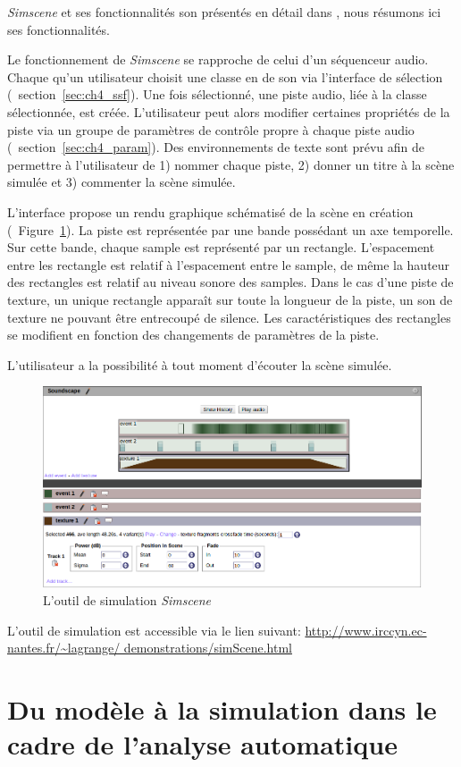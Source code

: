 \emph{Simscene} et ses fonctionnalités son présentés en détail dans \citep{rossignol2015simscene}, nous résumons ici ses fonctionnalités. 

Le fonctionnement de \emph{Simscene} se rapproche de celui d'un séquenceur audio. Chaque qu’un utilisateur choisit une classe en de son via l'interface de sélection (\cf~section~\ref{sec:ch4_ssf}). Une fois sélectionné, une piste audio, liée à la classe sélectionnée, est créée. L'utilisateur peut alors modifier certaines propriétés de la piste via un groupe de paramètres de contrôle propre à chaque piste audio (\cf~section~\ref{sec:ch4_param}). Des environnements de texte sont prévu afin de permettre à l'utilisateur de 1) nommer chaque piste, 2) donner un titre à la scène simulée et 3) commenter la scène simulée.

L'interface propose un rendu graphique schématisé de la scène en création (\Cf~Figure~\ref{fig:simscene}). La piste est représentée par une bande possédant un axe temporelle. Sur cette bande, chaque sample est représenté par un rectangle. L'espacement entre les rectangle est relatif à l'espacement entre le sample, de même la hauteur des rectangles est relatif au niveau sonore des samples. Dans le cas d'une piste de texture, un unique rectangle apparaît sur toute la longueur de la piste, un son de texture ne pouvant être entrecoupé de silence. Les caractéristiques des rectangles se modifient en fonction des changements de paramètres de la piste.

L'utilisateur a la possibilité à tout moment d'écouter la scène simulée.

\begin{figure}[bth]
        \myfloatalign
        \includegraphics[width=.8\linewidth]{gfx/simscene}
       \caption{L'outil de simulation \emph{Simscene}}\label{fig:simscene}
\end{figure}

L'outil de simulation est accessible via le lien suivant: \url{http://www.irccyn.ec-nantes.fr/~lagrange/
demonstrations/simScene.html}

\section{Du modèle à la simulation dans le cadre de l'analyse automatique}
\label{sec:ch4_modAnaAuto}

